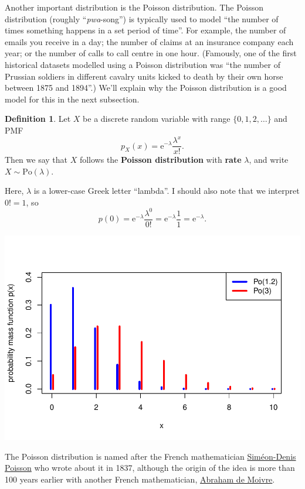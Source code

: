 \documentclass[
  a4paper,
]{book}
\theoremstyle{definition}
\newtheorem{definition}{Definition}[chapter]
\theoremstyle{definition}
\theoremstyle{definition}
\theoremstyle{definition}
\theoremstyle{remark}
\begin{document}
Another important distribution is the Poisson distribution. The Poisson distribution (roughly ``\emph{pwa}-song'') is typically used to model ``the number of times something happens in a set period of time''. For example, the number of emails you receive in a day; the number of claims at an insurance company each year; or the number of calls to call centre in one hour. (Famously, one of the first historical datasets modelled using a Poisson distribution was ``the number of Prussian soldiers in different cavalry units kicked to death by their own horse between 1875 and 1894''.) We'll explain why the Poisson distribution is a good model for this in the next subsection.

\begin{definition}
Let \(X\) be a discrete random variable with range \(\{0,1,2,\dots\}\) and PMF
\[ p_X(x) = \mathrm e^{-\lambda}  \frac{\lambda^x}{x!} . \]
Then we say that \(X\) follows the \textbf{Poisson distribution} with \textbf{rate} \(\lambda\), and write \(X \sim \text{Po}(\lambda)\).
\end{definition}

Here, \(\lambda\) is a lower-case Greek letter ``lambda''. I should also note that we interpret \(0! = 1\), so
\[ p(0) = \mathrm e^{-\lambda}  \frac{\lambda^0}{0!} = \mathrm e^{-\lambda}  \frac{1}{1} = \mathrm e^{-\lambda} . \]

\includegraphics{math1710_files/figure-latex/po-pic-1.pdf}

The Poisson distribution is named after the French mathematician \href{https://mathshistory.st-andrews.ac.uk/Biographies/Poisson/}{Siméon-Denis Poisson} who wrote about it in 1837, although the origin of the idea is more than 100 years earlier with another French mathematician, \href{https://mathshistory.st-andrews.ac.uk/Biographies/De_Moivre/}{Abraham de Moivre}.
\end{document}

